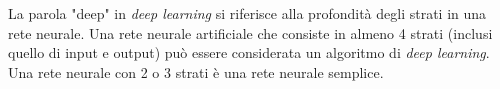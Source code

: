 \par La parola "deep" in \textit{deep learning} si riferisce alla profondità degli strati in una rete neurale. Una rete neurale artificiale che consiste in almeno 4 strati (inclusi quello di input e output) può essere considerata un algoritmo di \textit{deep learning}\supercite{neuralNetworksIBM}. Una rete neurale con 2 o 3 strati è una rete neurale semplice.

\clearpage